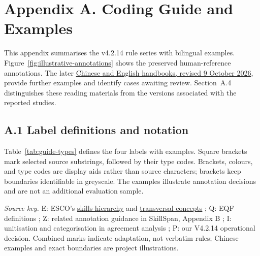 \newcommand{\gspan}[2]{{\setlength{\fboxsep}{1.4pt}\colorbox{guide#1}{\strut [#2]\,\textsf{[#1]}}}}
\newcommand{\gcontext}[1]{\textcolor{black!75}{#1}}
\newcommand{\gsource}[1]{\,\textsuperscript{\textsf{[#1]}}}
\newcommand{\ggloss}[1]{\par\emph{#1}}

\section{Appendix A. Coding Guide and Examples}
\label{app:a}
\label{sec:handbook-current}
This appendix summarises the v4.2.14 rule series with bilingual examples. Figure~\ref{fig:illustrative-annotations} shows the preserved human-reference annotations. The later \href{https://github.com/AlfredJamesLi/chinese-skillspan-benchmark/blob/5c12ecd06e37091d8b28a3831738efd1401abdb2/notes/handbooks/reader_20261007/README.md}{Chinese and English handbooks, revised 9 October 2026}, provide further examples and identify cases awaiting review. Section~A.4 distinguishes these reading materials from the versions associated with the reported studies.

\subsection{A.1 Label definitions and notation}
Table~\ref{tab:guide-types} defines the four labels with examples. Square brackets mark selected source substrings, followed by their type codes. Brackets, colours, and type codes are display aids rather than source characters; brackets keep boundaries identifiable in greyscale. The examples illustrate annotation decisions and are not an additional evaluation sample.

\noindent\textit{Source key.} E: ESCO's \href{https://esco.ec.europa.eu/en/about-esco/escopedia/escopedia/skills-pillar}{skills hierarchy} and \href{https://esco.ec.europa.eu/en/about-esco/escopedia/escopedia/transversal-knowledge-skills-and-competences}{transversal concepts} \citep{ESCOv1_2_2024}; Q: EQF definitions \citep{council2017eqf}; Z: related annotation guidance in SkillSpan, Appendix B \citep{zhang2022skillspan}; I: unitisation and categorisation in agreement analysis \citep{artstein2008agreement}; P: our V4.2.14 operational decision. Combined marks indicate adaptation, not verbatim rules; Chinese examples and exact boundaries are project illustrations.

